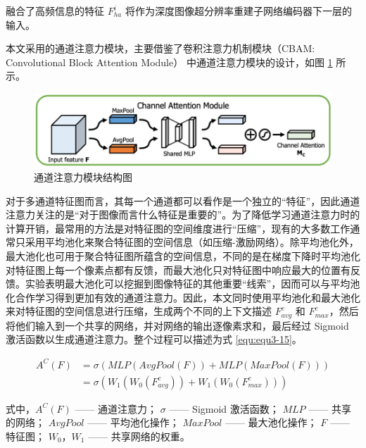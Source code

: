 融合了高频信息的特征 $F_{ha}^i$ 将作为深度图像超分辨率重建子网络编码器下一层的输入。

本文采用的通道注意力模块，主要借鉴了卷积注意力机制模块（CBAM: Convolutional Block Attention Module） \cite{DBLP:conf/eccv/WooPLK18} 中通道注意力模块的设计，如图 \ref{fig:fig3-6} 所示。

\begin{figure}[!htbp]
	\centering
	\includegraphics{figures/23.png}
	\caption{通道注意力模块结构图}
	\label{fig:fig3-6}
	\vspace{-0.8cm}  %
\end{figure}

对于多通道特征图而言，其每一个通道都可以看作是一个独立的“特征”，因此通道注意力关注的是“对于图像而言什么特征是重要的”。为了降低学习通道注意力时的计算开销，最常用的方法是对特征图的空间维度进行“压缩”，现有的大多数工作通常只采用平均池化来聚合特征图的空间信息（如压缩-激励网络）。除平均池化外，最大池化也可用于聚合特征图所蕴含的空间信息，不同的是在梯度下降时平均池化对特征图上每一个像素点都有反馈，而最大池化只对特征图中响应最大的位置有反馈。实验表明最大池化可以挖掘到图像特征的其他重要“线索”，因而可以与平均池化合作学习得到更加有效的通道注意力。因此，本文同时使用平均池化和最大池化来对特征图的空间信息进行压缩，生成两个不同的上下文描述 $F_{avg}^c$ 和 $F_{max}^c$，然后将他们输入到一个共享的网络，并对网络的输出逐像素求和，最后经过 Sigmoid 激活函数以生成通道注意力。整个过程可以描述为式 \ref{equ:equ3-15}。

\begin{equation}
\begin{aligned}
	A^C\left(F\right)&=\sigma\left(MLP\left(AvgPool\left(F\right)\right)+MLP\left(MaxPool\left(F\right)\right)\right)\\
	&=\sigma\left(W_1\left(W_0\left(F_{avg}^c\right)\right)+W_1\left(W_0\left(F_{max}^c\right)\right)\right)
\end{aligned}
\label{equ:equ3-15}
\end{equation}

\noindent 式中，$A^C\left(F\right)$ —— 通道注意力；\newline
\indent\quad $\sigma$ —— Sigmoid 激活函数；\newline
\indent\quad $MLP$ —— 共享的网络；\newline
\indent\quad $AvgPool$ —— 平均池化操作；\newline
\indent\quad $MaxPool$ —— 最大池化操作；\newline
\indent\quad $F$ —— 特征图；\newline
\indent\quad $W_0$，$W_1$ —— 共享网络的权重。

